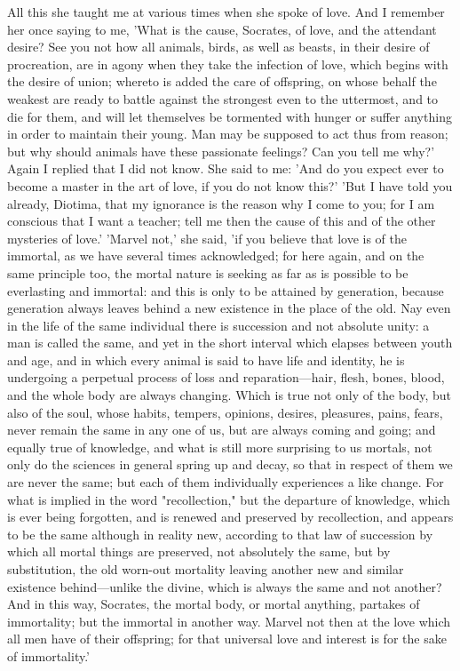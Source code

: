 \documentclass[11pt,letter]{article}
\begin{document}
\par  All this she taught me at various times when she spoke of love. And I remember her once saying to me, 'What is the cause, Socrates, of love, and the attendant desire? See you not how all animals, birds, as well as beasts, in their desire of procreation, are in agony when they take the infection of love, which begins with the desire of union; whereto is added the care of offspring, on whose behalf the weakest are ready to battle against the strongest even to the uttermost, and to die for them, and will let themselves be tormented with hunger or suffer anything in order to maintain their young. Man may be supposed to act thus from reason; but why should animals have these passionate feelings? Can you tell me why?' Again I replied that I did not know. She said to me: 'And do you expect ever to become a master in the art of love, if you do not know this?' 'But I have told you already, Diotima, that my ignorance is the reason why I come to you; for I am conscious that I want a teacher; tell me then the cause of this and of the other mysteries of love.' 'Marvel not,' she said, 'if you believe that love is of the immortal, as we have several times acknowledged; for here again, and on the same principle too, the mortal nature is seeking as far as is possible to be everlasting and immortal: and this is only to be attained by generation, because generation always leaves behind a new existence in the place of the old. Nay even in the life of the same individual there is succession and not absolute unity: a man is called the same, and yet in the short interval which elapses between youth and age, and in which every animal is said to have life and identity, he is undergoing a perpetual process of loss and reparation—hair, flesh, bones, blood, and the whole body are always changing. Which is true not only of the body, but also of the soul, whose habits, tempers, opinions, desires, pleasures, pains, fears, never remain the same in any one of us, but are always coming and going; and equally true of knowledge, and what is still more surprising to us mortals, not only do the sciences in general spring up and decay, so that in respect of them we are never the same; but each of them individually experiences a like change. For what is implied in the word "recollection," but the departure of knowledge, which is ever being forgotten, and is renewed and preserved by recollection, and appears to be the same although in reality new, according to that law of succession by which all mortal things are preserved, not absolutely the same, but by substitution, the old worn-out mortality leaving another new and similar existence behind—unlike the divine, which is always the same and not another? And in this way, Socrates, the mortal body, or mortal anything, partakes of immortality; but the immortal in another way. Marvel not then at the love which all men have of their offspring; for that universal love and interest is for the sake of immortality.'
\end{document}
